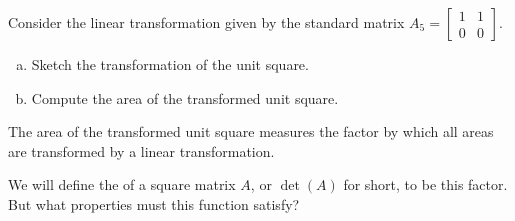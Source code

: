 \begin{applicationActivities}{1}{25}
\begin{activity}{5}
Consider the linear transformation given by the standard matrix
 $A_5 = \begin{bmatrix} 1 & 1 \\ 0 & 0 \end{bmatrix}$.

\begin{enumerate}[(a)]
\item Sketch the transformation of the unit square.
\item Compute the area of the transformed unit square.
\end{enumerate}
\end{activity}


\begin{remark}
The area of the transformed unit square measures the factor by which
all areas are transformed by a linear transformation.

We will define the  of a square matrix \(A\),
or \(\det(A)\) for short, to be this factor. But
what properties must this function satisfy?
\end{remark}


\end{applicationActivities}
